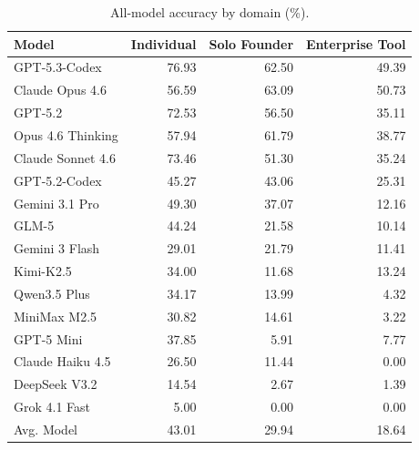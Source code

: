 \begin{table}[!h]
\centering
\caption{All-model accuracy by domain (\%).}
\label{tab:all_model_domain_appendix}
\small
\setlength{\tabcolsep}{2pt}
\renewcommand{\arraystretch}{0.9}
\begin{tabular}{@{}lrrr@{}}
\toprule
\textbf{Model} & \textbf{Individual} & \textbf{Solo Founder} & \textbf{Enterprise Tool} \\
\midrule
GPT-5.3-Codex & 76.93 & 62.50 & 49.39 \\
Claude Opus 4.6 & 56.59 & 63.09 & 50.73 \\
GPT-5.2 & 72.53 & 56.50 & 35.11 \\
Opus 4.6 Thinking & 57.94 & 61.79 & 38.77 \\
Claude Sonnet 4.6 & 73.46 & 51.30 & 35.24 \\
GPT-5.2-Codex & 45.27 & 43.06 & 25.31 \\
Gemini 3.1 Pro & 49.30 & 37.07 & 12.16 \\
GLM-5 & 44.24 & 21.58 & 10.14 \\
Gemini 3 Flash & 29.01 & 21.79 & 11.41 \\
Kimi-K2.5 & 34.00 & 11.68 & 13.24 \\
Qwen3.5 Plus & 34.17 & 13.99 & 4.32 \\
MiniMax M2.5 & 30.82 & 14.61 & 3.22 \\
GPT-5 Mini & 37.85 & 5.91 & 7.77 \\
Claude Haiku 4.5 & 26.50 & 11.44 & 0.00 \\
DeepSeek V3.2 & 14.54 & 2.67 & 1.39 \\
Grok 4.1 Fast & 5.00 & 0.00 & 0.00 \\
Avg. Model & 43.01 & 29.94 & 18.64 \\
\bottomrule
\end{tabular}
\end{table}

\clearpage


